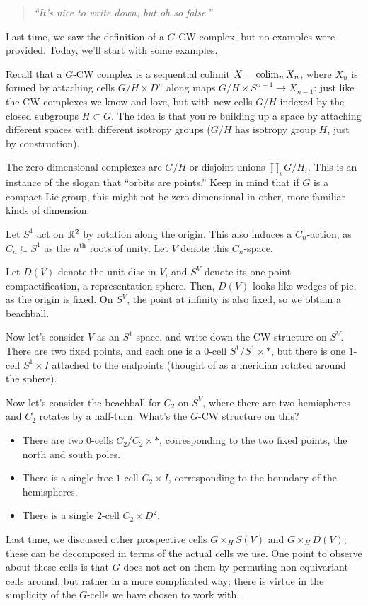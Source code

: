 \begin{quote}\textit{
	``It's nice to write down, but oh so false.''
}\end{quote}
Last time, we saw the definition of a $G$-CW complex, but no examples were provided. Today, we'll start with some
examples.

Recall that a $G$-CW complex is a sequential colimit $X = \operatorname{colim}_n X_n$, where $X_n$ is formed by attaching cells
$G/H\times D^n$ along maps $G/H\times S^{n-1}\to X_{n-1}$: just like the CW complexes we know and love, but with
new cells $G/H$ indexed by the closed subgroups $H\subset G$. The idea is that you're building up a space by
attaching different spaces with different isotropy groups ($G/H$ has isotropy group $H$, just by construction).
\begin{exm}
The zero-dimensional complexes are $G/H$ or disjoint unions $\amalg_i G/H_i$. This is an instance of the slogan
that ``orbits are points.'' Keep in mind that if $G$ is a compact Lie group, this might not be zero-dimensional in
other, more familiar kinds of dimension.
\end{exm}
\begin{exm}
Let $S^1$ act on $\mathbb R^2$ by rotation along the origin. This also induces a $C_n$-action, as $C_n\subseteq S^1$ as
the $n^{\text{th}}$ roots of unity. Let $V$ denote this $C_n$-space.

Let $D(V)$ denote the unit disc in $V$, and $S^V$ denote its one-point compactification, a representation sphere.
Then, $D(V)$ looks like wedges of pie, as the origin is fixed. On $S^V$, the point at infinity is also fixed, so we
obtain a beachball. %

Now let's consider $V$ as an $S^1$-space, and write down the CW structure on $S^V$. There are two fixed points, and
each one is a $0$-cell $S^1/S^1\times *$, but there is one $1$-cell $S^1\times I$ attached to the endpoints
(thought of as a meridian rotated around the sphere).

Now let's consider the beachball for $C_2$ on $S^V$, where there are two hemispheres and $C_2$ rotates by a
half-turn. What's the $G$-CW structure on this?
\begin{itemize}
	\item There are two $0$-cells $C_2/C_2\times *$, corresponding to the two fixed points, the north and south
	poles.
	\item There is a single free $1$-cell $C_2\times I$, corresponding to the boundary of the hemispheres.
	\item There is a single $2$-cell $C_2\times D^2$.\qedhere
\end{itemize}
\end{exm}
Last time, we discussed other prospective cells $G\times_H S(V)$ and $G\times_H D(V)$; these can be decomposed in
terms of the actual cells we use.  One point to observe about these cells is that $G$ does not act on them by permuting non-equivariant cells around, but rather in a more complicated way; there is virtue in the simplicity of the $G$-cells we have chosen to work with.

